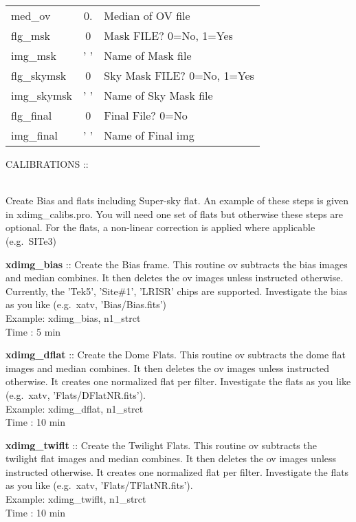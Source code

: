 \documentclass[11pt,letterpaper,dvips]{article}
\begin{document}
\begin{enumerate}
\begin{Aenumerate}
{\begin{tabular}{lcl}
          med\_ov &  0. &      Median of OV file \\
          flg\_msk &  0 &      Mask FILE?  0=No, 1=Yes   \\
          img\_msk &  ' ' &    Name of Mask file \\
          flg\_skymsk &   0 &  Sky Mask FILE?  0=No, 1=Yes   \\
          img\_skymsk &  ' ' & Name of Sky Mask file \\
          flg\_final & 0 &     Final File? 0=No \\
          img\_final & ' ' &  Name of Final img \\
	  \hline
	\end{tabular}
	}

  \end{Aenumerate}

  \clearpage
{\Large  \item CALIBRATIONS :: } \\
	Create Bias and flats including Super-sky flat.
	An example of these steps is given in xdimg\_calibs.pro.  You will
	need one set of flats but otherwise these steps are optional.
	For the flats, a non-linear correction is applied where applicable
	(e.g.\ SITe3)

  \begin{Aenumerate}

    \item {\bf xdimg\_bias} :: Create the Bias frame.  This routine ov
	subtracts the bias images and median combines.  It then deletes
	the ov images unless instructed otherwise.  Currently, the 
	'Tek5', 'Site\#1', 'LRISR' chips are supported.  Investigate the
	bias as you like (e.g.\ xatv, 'Bias/Bias.fits') \\
         	\quad Example: xdimg\_bias, n1\_strct \\
	        \quad Time   : 5 min

    \item {\bf xdimg\_dflat} :: Create the Dome Flats.  This routine ov
	subtracts the dome flat images and median combines.  It then deletes
	the ov images unless instructed otherwise.  It creates one normalized
	flat per filter.  Investigate the
	flats as you like (e.g.\ xatv, 'Flats/DFlatNR.fits'). \\
         	\quad Example: xdimg\_dflat, n1\_strct \\
	        \quad Time   : 10 min

    \item {\bf xdimg\_twiflt} :: Create the Twilight Flats.  This routine ov
	subtracts the twilight flat images and median combines.  It then deletes
	the ov images unless instructed otherwise.  It creates one normalized
	flat per filter.  Investigate the
	flats as you like (e.g.\ xatv, 'Flats/TFlatNR.fits'). \\
         	\quad Example: xdimg\_twiflt, n1\_strct \\
	        \quad Time   : 10 min
 \end{Aenumerate}


\end{enumerate}
\end{document}
